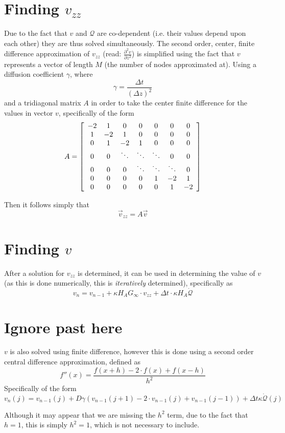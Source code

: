 \documentclass[12pt,letterpaper]{article}
\newcommand{\pd}[2]{\frac{\partial#1}{\partial#2}}
\newcommand{\script}[1]{\mathcal{#1}} %
\begin{document}
\section{Finding $v_{zz}$}
Due to the fact that $v$ and $\script{Q}$ are co-dependent (i.e. their values
depend upon each other) they are thus solved simultaneously. The second order,
center, finite difference approximation of $v_{zz}$ (read: $\pd{^2 v}{z^2}$) is
simplified using the fact that $v$ represents a vector of length $M$ (the number
of nodes approximated at). Using a diffusion coefficient $\gamma$, where
\begin{equation}
\gamma = \frac{\Delta t}{ (\Delta z)^2}
\end{equation}
and a tridiagonal matrix $A$ in order to take the center finite difference for the
values in vector $v$, specifically of the form
\begin{equation}
A = \left[ \begin{array}{c c c c c c c }
-2	& 1		& 0		& 0		& 0		& 0		& 0\\
1	& -2	& 1		& 0		& 0		& 0		& 0\\
0	& 1		& -2	& 1		& 0		& 0		& 0\\
0	& 0		&\ddots	&\ddots	&\ddots	& 0		& 0\\
0	& 0		& 0		&\ddots	&\ddots	&\ddots	& 0\\
0	& 0		& 0		& 0		& 1		& -2	& 1\\
0	& 0		& 0		& 0		& 0		& 1		& -2\\
\end{array} \right]
\end{equation}

Then it follows simply that
\begin{equation}
\vec{v}_{zz} = A \vec{v}
\end{equation}

\section{Finding $v$}
After a solution for $v_{zz}$ is determined, it can be used in determining the
value of $v$ (as this is done numerically, this is \emph{iteratively} determined),
specifically as
\begin{equation}
v_n = v_{n-1} + \kappa H_A G_{\infty} \cdot v_{zz} + \Delta t \cdot \kappa H_A 
\dot{\script{Q}}
\end{equation}

\section{Ignore past here}
$v$ is also solved using finite difference, however this is done using a second
order central difference approximation, defined as
\begin{equation}
f'' (x) = \frac{f(x+h) - 2 \cdot f(x) + f(x-h)}{h^2}
\end{equation}
Specifically of the form
\begin{equation}
v_n (j) = v_{n-1}(j) + D \gamma \left(v_{n-1}(j+1)- 2 \cdot v_{n-1}(j) + 
v_{n-1}(j-1) \right) + \Delta t \kappa \dot{\script{Q}}(j)
\end{equation}

Although it may appear that we are missing the $h^2$ term, due to the fact that
$h=1$, this is simply $h^2 = 1$, which is not necessary to include.
\end{document}
